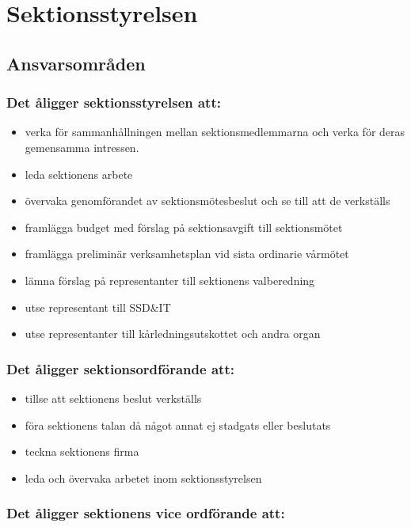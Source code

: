 \section{Sektionsstyrelsen}

\subsection{Ansvarsområden}

\subsubsection{Det åligger sektionsstyrelsen att:}

\begin{itemize}
  \item verka för sammanhållningen mellan sektionsmedlemmarna och verka för deras gemensamma intressen. 
  \item leda sektionens arbete 
  \item övervaka genomförandet av sektionsmötesbeslut och se till att de verkställs 
  \item framlägga budget med förslag på sektionsavgift till sektionsmötet 
  \item framlägga preliminär verksamhetsplan vid sista ordinarie vårmötet 
  \item lämna förslag på representanter till sektionens valberedning 
  \item utse representant till SSD\&IT 
  \item utse representanter till kårledningsutskottet och andra organ 
\end{itemize}

\subsubsection{Det åligger sektionsordförande att:} 

\begin{itemize}
  \item tillse att sektionens beslut verkställs 
  \item föra sektionens talan då något annat ej stadgats eller beslutats 
  \item teckna sektionens firma 
  \item leda och övervaka arbetet inom sektionsstyrelsen 
\end{itemize}

\subsubsection{Det åligger sektionens vice ordförande att:}

